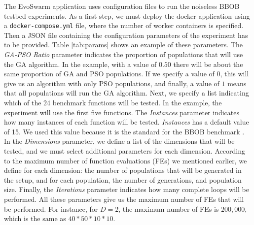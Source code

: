 \documentclass[review]{elsarticle}
\begin{document}
The EvoSwarm application uses configuration files to run the noiseless BBOB testbed
experiments.  As a first step, we must deploy the docker application using a
{\tt docker-compose.yml} file, where the number of worker containers is
specified. Then a JSON file containing the configuration parameters of the
experiment has to be provided.  Table \ref{tab:params} shows an example of these
parameters. The { \em GA-PSO Ratio} parameter indicates the proportion of
populations that will use the GA algorithm.  In the example, with a value of
$0.50$ there will be about the same proportion of GA and PSO populations. If we
specify a value of $0$, this will give us an algorithm with only PSO
populations, and finally, a value of  $1$ means that all populations will run
the GA algorithm. Next, we specify a list indicating which of the 24 benchmark
functions will be tested. In the example, the experiment will use the first five
functions.  The {\em Instances} parameter indicates how many instances of each
function will be tested. {\em Instances}  has a default value of 15. We used this
value because it is the standard for the BBOB benchmark \cite{hansen2016coco}.
In the {\em Dimensions} parameter, we define a list of the dimensions that will
be tested, and we must select additional parameters for each dimension.
According to the maximum number of function evaluations (FEs) we mentioned
earlier, we define for each dimension: the number of populations that will be
generated in the setup, and for each population,  the number of generations, and
population size. Finally, the {\em Iterations} parameter indicates how many
complete loops will be performed. All these parameters give us the maximum
number of FEs that will be performed. For instance, for $D = 2$, the maximum
number of FEs is $200,000$, which is the same as $40*50*10*10$.
\end{document}
